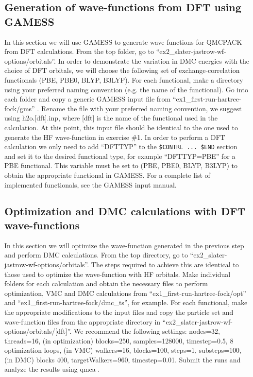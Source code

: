 \subsection{Generation of wave-functions from DFT using GAMESS}
In this section we will use GAMESS to generate wave-functions for QMCPACK from
DFT calculations. From the top folder, go to ``ex2\_slater-jastrow-wf-options/orbitals''. In order to demonstrate
the variation in DMC energies with the choice of DFT orbitals, we will choose the following
set of exchange-correlation functionals (PBE, PBE0, BLYP, B3LYP). For each functional,
make a directory using your preferred naming convention (e.g. the name of the functional).
Go into each folder and copy a generic GAMESS input file from %
``ex1\_first-run-hartree-fock/gms'' .%
Rename the file with your preferred naming convention, we suggest using h2o.[dft].inp, where [dft] is the name of
the functional used in the calculation. At this point, this input file should be identical to the
one used to generate the HF wave-function in exercise \#1. In order to perform a DFT
calculation we only need to add ``DFTTYP'' to the \texttt{\$CONTRL ... \$END} section and set
it to the desired functional type, for example ``DFTTYP=PBE'' for a PBE functional. This
variable must be set to (PBE, PBE0, BLYP, B3LYP) to obtain the appropriate functional in
GAMESS. For a complete list of implemented functionals, see the GAMESS input manual.


\subsection{Optimization and DMC calculations with DFT wave-functions}
In this section we will optimize the wave-function generated in the previous step and
perform DMC calculations. From the top directory, go to “ex2\_slater-jastrow-wf-options/orbitals”.
The steps required to achieve this are identical to those used to optimize the wave-function
with HF orbitals. Make individual folders for each calculation and obtain the necessary files
to perform optimization, VMC and DMC calculations from ``ex1\_first-run-hartree-fock/opt'' and ``ex1\_first-run-hartree-fock/dmc\_ts'', for example.
For each functional, make the appropriate modifications to the input files and copy the particle 
set and wave-function files from the appropriate directory in “ex2\_slater-jastrow-wf-options/orbitals/[dft]”. We
recommend the following settings: nodes=32, threads=16, (in optimization) blocks=250,
samples=128000, timestep=0.5, 8 optimization loops, (in VMC) walkers=16, blocks=100,
steps=1, substeps=100, (in DMC) blocks 400, targetWalkers=960, timestep=0.01. Submit
the runs and analyze the results using qmca .

